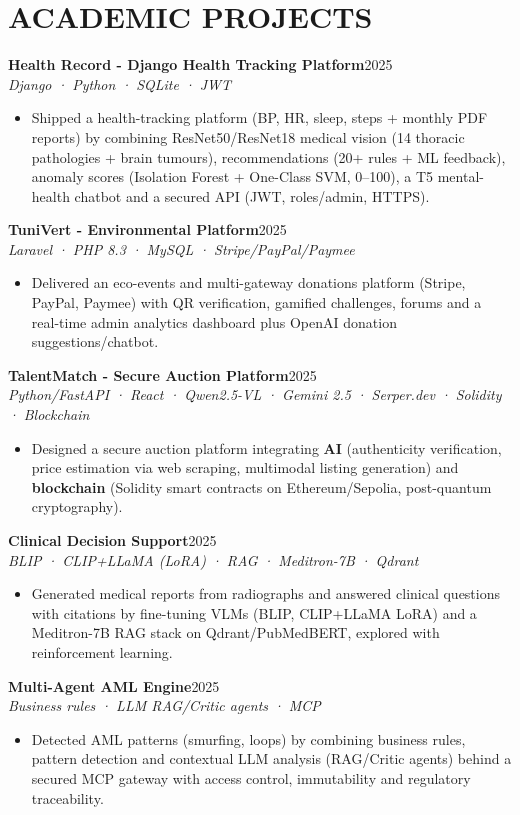 \documentclass[10pt,a4paper]{article}
\newcommand{\proj}[3]{%
 \textbf{\color{primary}#1}\hfill{\color{muted}\small #2}\\[-1pt]
 {\color{accent}\textit{#3}}\\[1pt]
 \begin{itemize}[leftmargin=0.85em, itemsep=1pt, topsep=0pt, parsep=0pt, partopsep=0pt]
}
\begin{document}
\section{ACADEMIC PROJECTS}
{\footnotesize
\setlength{\parskip}{1pt}

\proj{Health Record - Django Health Tracking Platform}{2025}{Django · Python · SQLite · JWT}
 \item Shipped a health-tracking platform (BP, HR, sleep, steps + monthly PDF reports) by combining ResNet50/ResNet18 medical vision (14 thoracic pathologies + brain tumours), recommendations (20+ rules + ML feedback), anomaly scores (Isolation Forest + One-Class SVM, 0--100), a T5 mental-health chatbot and a secured API (JWT, roles/admin, HTTPS).
\end{itemize}

\proj{TuniVert - Environmental Platform}{2025}{Laravel · PHP 8.3 · MySQL · Stripe/PayPal/Paymee}
 \item Delivered an eco-events and multi-gateway donations platform (Stripe, PayPal, Paymee) with QR verification, gamified challenges, forums and a real-time admin analytics dashboard plus OpenAI donation suggestions/chatbot.
\end{itemize}

\proj{TalentMatch - Secure Auction Platform}{2025}{Python/FastAPI · React · Qwen2.5-VL · Gemini 2.5 · Serper.dev · Solidity · Blockchain}
 \item Designed a secure auction platform integrating \textbf{AI} (authenticity verification, price estimation via web scraping, multimodal listing generation) and \textbf{blockchain} (Solidity smart contracts on Ethereum/Sepolia, post-quantum cryptography).
\end{itemize}

\proj{Clinical Decision Support}{2025}{BLIP · CLIP+LLaMA (LoRA) · RAG · Meditron-7B · Qdrant}
 \item Generated medical reports from radiographs and answered clinical questions with citations by fine-tuning VLMs (BLIP, CLIP+LLaMA LoRA) and a Meditron-7B RAG stack on Qdrant/PubMedBERT, explored with reinforcement learning.
\end{itemize}

\proj{Multi-Agent AML Engine}{2025}{Business rules · LLM RAG/Critic agents · MCP}
 \item Detected AML patterns (smurfing, loops) by combining business rules, pattern detection and contextual LLM analysis (RAG/Critic agents) behind a secured MCP gateway with access control, immutability and regulatory traceability.
\end{itemize}

}
\end{document}

